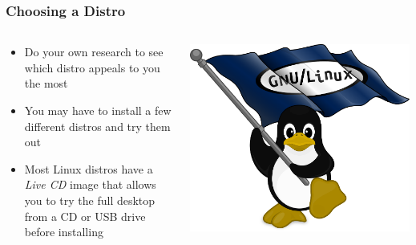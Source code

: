 \documentclass{lug}
\begin{document}
\begin{frame}
    \frametitle{Choosing a Distro}

    \begin{columns}
        \begin{column}{0.7\textwidth}
        \begin{itemize}[<+->]
            \setlength\itemsep{1em}
            \item Do your own research to see which distro appeals to you the
                most
            \item You may have to install a few different distros and try them
                out
            \item Most Linux distros have a \emph{Live CD} image that allows
                you to try the full desktop from a CD or USB drive before installing
        \end{itemize}
        \end{column}

        \begin{column}{0.3\textwidth}
            \includegraphics[width=\textwidth]{graphics/tux_flag}
        \end{column}
    \end{columns}
\end{frame}
\end{document}
